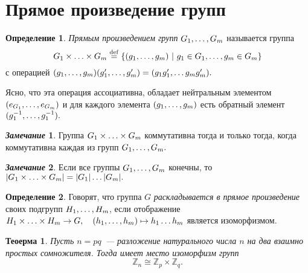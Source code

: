 \documentclass[a4paper, 14pt]{extarticle}
\newcommand{\deq}{\stackrel{\mathrm{def}}{=}}
\newcommand{\n}{\par}
\newcommand{\integers}{\mathbb{Z}}
\theoremstyle{definition}
\newtheorem*{remark}{\textit{Замечание}}
\newtheorem{definition}{Определение}
\theoremstyle{plain}
\newtheorem{theorem}{Теоерма}
\numberwithin{theorem}{section}
\numberwithin{definition}{section}
\numberwithin{statement}{section}
\numberwithin{lemma}{section}
\numberwithin{consequence}{section}
\begin{document}
	\section{Прямое произведение групп}
	\setcounter{definition}{0}
	\begin{definition}
		\textit{Прямым произведением групп} $G_1, \mathellipsis, G_m$ называется группа
		\begin{equation*}
			G_1 \times \mathellipsis \times G_m \deq \{(g_1, \mathellipsis, g_m) \ | \ g_1 \in G_1, \mathellipsis, g_m \in G_m\}
		\end{equation*}
		с операцией $(g_1, \mathellipsis, g_m)(g'_1, \mathellipsis, g'_m) = (g_1g'_1, \mathellipsis g_mg'_m).$ \n
		Ясно, что эта операция ассоциативна, обладает нейтральным элементом $(e_{G_1}, \mathellipsis, e_{G_m})$ и для каждого элемента $(g_1, \mathellipsis, g_m)$ есть обратный элемент $(g^{-1}_1, \mathellipsis, g^{-1}_1).$
	\end{definition}
	\begin{remark}
		Группа $G_1 \times \mathellipsis \times G_m$ коммутативна тогда и только тогда, когда коммутативна каждая из групп $G_1, \mathellipsis, G_m.$
	\end{remark}
	\begin{remark}
		Если все группы ${G_1, \mathellipsis, G_m}$ конечны, то ${|G_1 \times \mathellipsis \times G_m| = |G_1| \mathellipsis |G_m|.}$
	\end{remark}
	\begin{definition}
		Говорят, что группа $G$ \textit{раскладывается в прямое произведение} своих подгрупп ${H_1, \mathellipsis, H_m}$, если отображение
		${H_1 \times \mathellipsis \times H_m \rightarrow G, \quad (h_1, \mathellipsis, h_m) \mapsto h_1 \mathellipsis h_m}$ является изоморфизмом.
	\end{definition}
	\begin{theorem}
		Пусть ${n = pq}$~--- разложение натурального числа $n$ на два взаимно простых сомножителя. Тогда имеет место изоморфизм групп
		\begin{equation*}
			\integers_n \cong \integers_p \times \integers_q.
		\end{equation*}
	\end{theorem}
	\newpage
\end{document}
